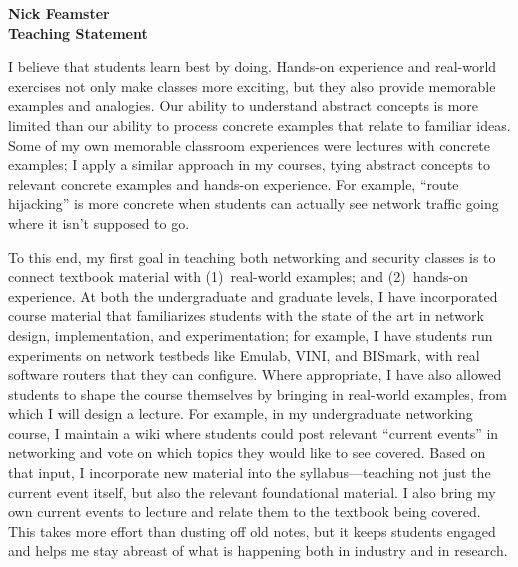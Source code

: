 \documentclass{article}
\begin{document}
\vspace*{-0.45in}
\begin{center}
{\Large\textbf{Nick Feamster}}\\[0.1in] {\large\textbf{
Teaching Statement}}\\
\end{center}
I believe that students learn best by doing.  Hands-on experience and
real-world exercises not only make classes more exciting, but they
also provide memorable examples and analogies.  Our ability to
understand abstract concepts is more limited than our ability to process
concrete examples that relate to familiar ideas.  Some of
my own memorable classroom experiences were lectures with concrete
examples; I apply a similar approach in my courses, tying abstract
concepts to relevant concrete examples and hands-on experience.  For
example, ``route hijacking'' is more concrete when students can
actually see network traffic going where it isn't supposed to go.

To this end, my first goal in teaching both networking and security
classes is to connect textbook material with (1)~real-world examples;
and (2)~hands-on experience.  At both the undergraduate and graduate
levels, I have incorporated course material that familiarizes students
with the state of the art in network design, implementation, and
experimentation; for example, I have students run experiments on network
testbeds like Emulab, VINI, and BISmark, with real software routers that
they can configure.  Where appropriate, I have also allowed students to
shape the course themselves by bringing in real-world examples, from
which I will design a lecture.  For example, in my undergraduate
networking course, I maintain a wiki where students could post relevant
``current events'' in networking and vote on which topics they would
like to see covered.  Based on that input, I incorporate new material
into the syllabus---teaching not just the current event itself, but also
the relevant foundational material.  I also bring my own current events
to lecture and relate them to the textbook being covered.  This takes
more effort than dusting off old notes, but it keeps students engaged
and helps me stay abreast of what is happening both in industry and in
research.
\end{document}
